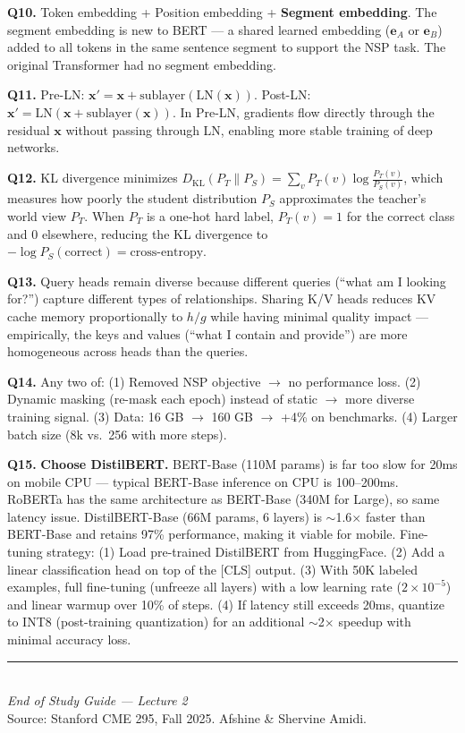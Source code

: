 \documentclass[11pt, a4paper]{article}
\begin{document}
\textbf{Q10.} Token embedding + Position embedding + \textbf{Segment embedding}. The segment embedding is new to BERT --- a shared learned embedding ($\mathbf{e}_A$ or $\mathbf{e}_B$) added to all tokens in the same sentence segment to support the NSP task. The original Transformer had no segment embedding.

\textbf{Q11.} Pre-LN: $\mathbf{x}' = \mathbf{x} + \text{sublayer}(\text{LN}(\mathbf{x}))$. Post-LN: $\mathbf{x}' = \text{LN}(\mathbf{x} + \text{sublayer}(\mathbf{x}))$. In Pre-LN, gradients flow directly through the residual $\mathbf{x}$ without passing through LN, enabling more stable training of deep networks.

\textbf{Q12.} KL divergence minimizes $D_{\text{KL}}(P_T \| P_S) = \sum_v P_T(v)\log\frac{P_T(v)}{P_S(v)}$, which measures how poorly the student distribution $P_S$ approximates the teacher's world view $P_T$. When $P_T$ is a one-hot hard label, $P_T(v) = 1$ for the correct class and 0 elsewhere, reducing the KL divergence to $-\log P_S(\text{correct}) = \text{cross-entropy}$.

\textbf{Q13.} Query heads remain diverse because different queries (``what am I looking for?'') capture different types of relationships. Sharing K/V heads reduces KV cache memory proportionally to $h/g$ while having minimal quality impact --- empirically, the keys and values (``what I contain and provide'') are more homogeneous across heads than the queries.

\textbf{Q14.} Any two of: (1) Removed NSP objective $\to$ no performance loss. (2) Dynamic masking (re-mask each epoch) instead of static $\to$ more diverse training signal. (3) Data: 16 GB $\to$ 160 GB $\to$ +4\% on benchmarks. (4) Larger batch size (8k vs.\ 256 with more steps).

\textbf{Q15.} \textbf{Choose DistilBERT.} BERT-Base (110M params) is far too slow for 20ms on mobile CPU --- typical BERT-Base inference on CPU is 100--200ms. RoBERTa has the same architecture as BERT-Base (340M for Large), so same latency issue. DistilBERT-Base (66M params, 6 layers) is $\sim$1.6$\times$ faster than BERT-Base and retains 97\% performance, making it viable for mobile. Fine-tuning strategy: (1) Load pre-trained DistilBERT from HuggingFace. (2) Add a linear classification head on top of the [CLS] output. (3) With 50K labeled examples, full fine-tuning (unfreeze all layers) with a low learning rate ($2 \times 10^{-5}$) and linear warmup over 10\% of steps. (4) If latency still exceeds 20ms, quantize to INT8 (post-training quantization) for an additional $\sim$2$\times$ speedup with minimal accuracy loss.

\vspace{1em}
\begin{center}
\rule{0.5\textwidth}{0.4pt}\\[6pt]
{\small\textit{End of Study Guide --- Lecture 2}}\\[4pt]
{\small Source: Stanford CME 295, Fall 2025. Afshine \& Shervine Amidi.}
\end{center}
\end{document}
